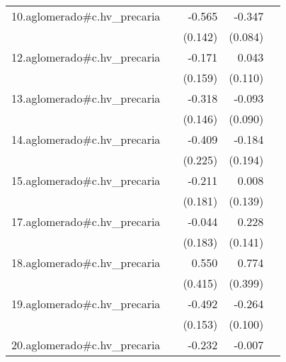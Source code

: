 {\begin{longtable}{l*{4}{D{.}{.}{-1}}}
\addlinespace
10.aglomerado#c.hv\_precaria&                     &      -0.565\sym{***}&      -0.347\sym{***}&                     \\
            &                     &     (0.142)         &     (0.084)         &                     \\
\addlinespace
12.aglomerado#c.hv\_precaria&                     &      -0.171         &       0.043         &                     \\
            &                     &     (0.159)         &     (0.110)         &                     \\
\addlinespace
13.aglomerado#c.hv\_precaria&                     &      -0.318\sym{*}  &      -0.093         &                     \\
            &                     &     (0.146)         &     (0.090)         &                     \\
\addlinespace
14.aglomerado#c.hv\_precaria&                     &      -0.409         &      -0.184         &                     \\
            &                     &     (0.225)         &     (0.194)         &                     \\
\addlinespace
15.aglomerado#c.hv\_precaria&                     &      -0.211         &       0.008         &                     \\
            &                     &     (0.181)         &     (0.139)         &                     \\
\addlinespace
17.aglomerado#c.hv\_precaria&                     &      -0.044         &       0.228         &                     \\
            &                     &     (0.183)         &     (0.141)         &                     \\
\addlinespace
18.aglomerado#c.hv\_precaria&                     &       0.550         &       0.774         &                     \\
            &                     &     (0.415)         &     (0.399)         &                     \\
\addlinespace
19.aglomerado#c.hv\_precaria&                     &      -0.492\sym{**} &      -0.264\sym{**} &                     \\
            &                     &     (0.153)         &     (0.100)         &                     \\
\addlinespace
20.aglomerado#c.hv\_precaria&                     &      -0.232         &      -0.007         &                     \\

\end{longtable}}
